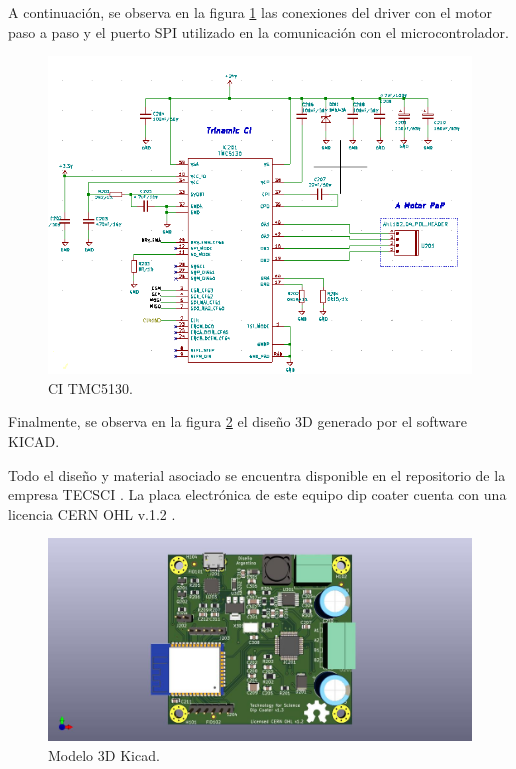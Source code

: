 A continuación, se observa en la figura \ref{fig:kicad_trinamic} las conexiones del driver con el motor paso a paso y el puerto SPI utilizado en la comunicación con el microcontrolador. 
 
\begin{figure}[h]
	\centering
	\includegraphics[width=1.2\textwidth]{./Figures/kicad_trinamic.png}
	\caption{CI TMC5130.}
	\label{fig:kicad_trinamic}
\end{figure} 

  
Finalmente, se observa en la figura \ref{fig:dip_3d_model} el diseño 3D generado por el software KICAD.

Todo el diseño y material asociado se encuentra disponible en el repositorio de la empresa TECSCI \citep{web_hardware_tecsci}. La placa electrónica de este equipo dip coater cuenta con una licencia CERN OHL v.1.2 \citep{web_cern_licence}.


\begin{figure}[!h]
	\centering
	\includegraphics[width=1\textwidth]{./Figures/tecsci_dip.jpg}
	\caption{Modelo 3D Kicad.}
	\label{fig:dip_3d_model}
\end{figure}
         




